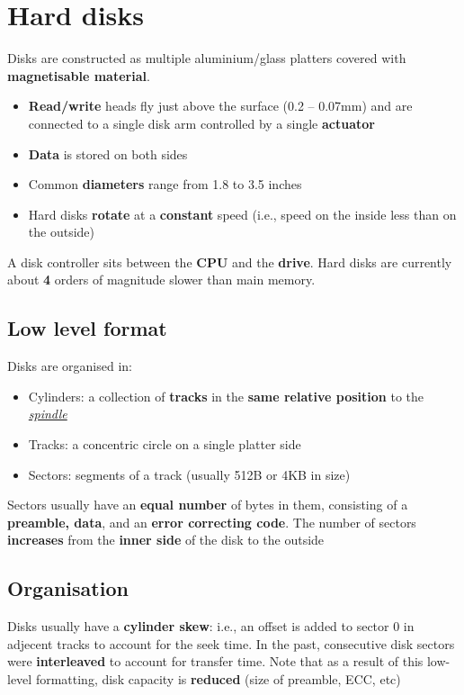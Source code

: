 \documentclass{article}
\newcommand{\worddef}[1]{\hyperref[sec:reference]{\textit{#1}}}
\begin{document}
\section{Hard disks}
\begin{flushleft}
Disks are constructed as multiple aluminium/glass platters covered with \textbf{magnetisable material}.
\begin{itemize}
	\item \textbf{Read/write} heads fly just above the surface (0.2 – 0.07mm) and are connected to a single disk arm controlled by a single \textbf{actuator}
	\item \textbf{Data} is stored on both sides
	\item Common \textbf{diameters} range from 1.8 to 3.5 inches
	\item Hard disks \textbf{rotate} at a \textbf{constant} speed (i.e., speed on the inside less than on the outside)
\end{itemize}
A disk controller sits between the \textbf{CPU} and the \textbf{drive}. Hard disks are currently about \textbf{4} orders of magnitude slower than main memory.
\end{flushleft}

\subsection{Low level format}
\begin{flushleft}
Disks are organised in:
\begin{itemize}
	\item Cylinders: a collection of \textbf{tracks} in the \textbf{same relative position} to the \worddef{spindle}
	\item Tracks: a concentric circle on a single platter side
	\item Sectors: segments of a track (usually 512B or 4KB in size)
\end{itemize}
Sectors usually have an \textbf{equal number} of bytes in them, consisting of a \textbf{preamble, data}, and an \textbf{error correcting code}. The number of sectors \textbf{increases} from the \textbf{inner side} of the disk to the outside
\end{flushleft}

\subsection{Organisation}
\begin{flushleft}
Disks usually have a \textbf{cylinder skew}: i.e., an offset is added to sector 0 in adjecent tracks to account for the seek time. In the past, consecutive disk sectors were \textbf{interleaved} to account for transfer time. Note that as a result of this low-level formatting, disk capacity is \textbf{reduced} (size of preamble, ECC, etc)
\end{flushleft}
\end{document}

